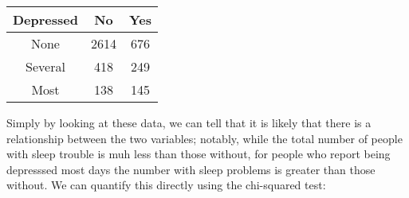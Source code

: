 \documentclass[]{book}
\theoremstyle{definition}
\theoremstyle{definition}
\theoremstyle{definition}
\theoremstyle{remark}
\begin{document}
\begin{longtable}[]{@{}ccc@{}}
\toprule
\begin{minipage}[b]{0.15\columnwidth}\centering\strut
Depressed\strut
\end{minipage} & \begin{minipage}[b]{0.09\columnwidth}\centering\strut
No\strut
\end{minipage} & \begin{minipage}[b]{0.09\columnwidth}\centering\strut
Yes\strut
\end{minipage}\tabularnewline
\midrule
\endhead
\begin{minipage}[t]{0.15\columnwidth}\centering\strut
None\strut
\end{minipage} & \begin{minipage}[t]{0.09\columnwidth}\centering\strut
2614\strut
\end{minipage} & \begin{minipage}[t]{0.09\columnwidth}\centering\strut
676\strut
\end{minipage}\tabularnewline
\begin{minipage}[t]{0.15\columnwidth}\centering\strut
Several\strut
\end{minipage} & \begin{minipage}[t]{0.09\columnwidth}\centering\strut
418\strut
\end{minipage} & \begin{minipage}[t]{0.09\columnwidth}\centering\strut
249\strut
\end{minipage}\tabularnewline
\begin{minipage}[t]{0.15\columnwidth}\centering\strut
Most\strut
\end{minipage} & \begin{minipage}[t]{0.09\columnwidth}\centering\strut
138\strut
\end{minipage} & \begin{minipage}[t]{0.09\columnwidth}\centering\strut
145\strut
\end{minipage}\tabularnewline
\bottomrule
\end{longtable}

Simply by looking at these data, we can tell that it is likely that
there is a relationship between the two variables; notably, while the
total number of people with sleep trouble is muh less than those
without, for people who report being depresssed most days the number
with sleep problems is greater than those without. We can quantify this
directly using the chi-squared test:
\end{document}
